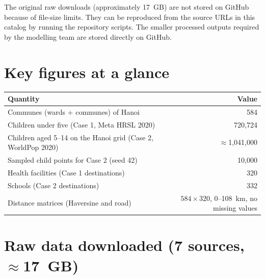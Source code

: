 \documentclass[11pt,a4paper]{article}
\begin{document}
The original raw downloads (approximately 17~GB) are not stored on GitHub because of file-size limits. They can be reproduced from the source URLs in this catalog by running the repository scripts. The smaller processed outputs required by the modelling team are stored directly on GitHub.

\section{Key figures at a glance}

\begin{table}[h]
\centering
\begin{tabular}{@{}lr@{}}
\toprule
\textbf{Quantity} & \textbf{Value} \\
\midrule
Communes (wards + communes) of Hanoi & 584 \\
Children under five (Case 1, Meta HRSL 2020) & 720{,}724 \\
Children aged 5--14 on the Hanoi grid (Case 2, WorldPop 2020) & $\approx$1{,}041{,}000 \\
Sampled child points for Case 2 (seed 42) & 10{,}000 \\
Health facilities (Case 1 destinations) & 320 \\
Schools (Case 2 destinations) & 332 \\
Distance matrices (Haversine and road) & $584 \times 320$, 0--108~km, no missing values \\
\bottomrule
\end{tabular}
\end{table}

\section{Raw data downloaded (7 sources, $\approx$17~GB)}
\end{document}
